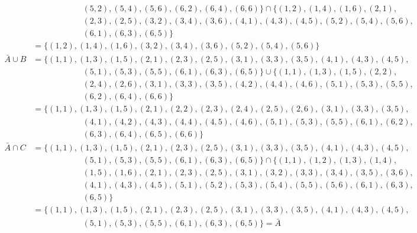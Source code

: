 \documentclass{article}
\begin{document}
\begin{sol}
\begin{enumerate}[$\quad$a)]
\begin{align*}
				&\quad\quad\quad\quad\quad\quad (5, 2), (5, 4), (5, 6), (6, 2), (6, 4), (6, 6) \} \cap \{ (1, 2), (1, 4), (1, 6), (2, 1),\\
				&\quad\quad\quad\quad\quad\quad (2, 3), (2, 5), (3, 2), (3, 4), (3, 6), (4, 1), (4, 3), (4, 5), (5, 2), (5, 4), (5, 6),\\
				&\quad\quad\quad\quad\quad\quad (6, 1), (6, 3), (6, 5)\}\\
				&= \{ (1,2), (1,4), (1, 6), (3, 2), (3, 4), (3, 6), (5, 2), (5, 4), (5, 6) \}  \\
				\bar{A} \cup B &= \{ (1, 1), (1, 3), (1, 5), (2, 1), (2, 3), (2, 5), (3, 1), (3, 3), (3, 5), (4, 1), (4, 3), (4, 5), \\
				&\quad\quad\quad\quad\quad\quad (5, 1), (5, 3), (5, 5), (6, 1), (6, 3), (6, 5) \} \cup \{ (1,1), (1,3), (1, 5), (2,2), \\
				&\quad\quad\quad\quad\quad\quad (2,4), (2,6), (3, 1), (3, 3), (3, 5), (4, 2), (4, 4), (4, 6), (5, 1), (5, 3), (5,5), \\
				&\quad\quad\quad\quad\quad\quad (6, 2), (6, 4), (6, 6) \}\\
				&= \{ (1, 1), (1, 3), (1,5), (2, 1), (2,2), (2,3), (2,4), (2,5), (2,6), (3,1), (3,3), (3,5), \\
				&\quad\quad\quad\quad\quad\quad (4,1), (4,2), (4,3), (4, 4), (4, 5), (4,6), (5,1), (5,3), (5,5), (6,1), (6,2), \\
				&\quad\quad\quad\quad\quad\quad(6,3), (6,4), (6,5), (6,6) \}\\
				\bar{A} \cap C &=  \{ (1, 1), (1, 3), (1, 5), (2, 1), (2, 3), (2, 5), (3, 1), (3, 3), (3, 5), (4, 1), (4, 3), (4, 5), \\
				&\quad\quad\quad\quad\quad\quad (5, 1), (5, 3), (5, 5), (6, 1), (6, 3), (6, 5) \} \cap \{ (1, 1), (1,2), (1, 3), (1, 4), \\
				&\quad\quad\quad\quad\quad\quad (1, 5), (1,6), (2, 1), (2, 3), (2, 5), (3, 1), (3,2), (3, 3), (3, 4), (3, 5), (3, 6), \\
				&\quad\quad\quad\quad\quad\quad (4, 1), (4, 3), (4, 5), (5,1), (5,2), (5, 3),(5, 4), (5, 5), (5, 6), (6, 1), (6, 3),\\
				&\quad\quad\quad\quad\quad\quad (6, 5) \} \\
				&= \{ (1,1), (1,3), (1,5), (2, 1), (2, 3), (2, 5), (3, 1), (3, 3), (3, 5), (4, 1), (4, 3), (4,5), \\
				&\quad\quad\quad\quad\quad\quad (5, 1), (5, 3), (5, 5), (6, 1), (6, 3), (6, 5) \} = \bar{A}
			\end{align*}
		\end{enumerate}
	\end{sol}
\pagebreak
\end{document}
